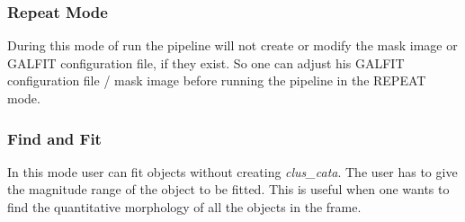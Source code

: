 \documentclass[a4paper,10pt]{article}
\begin{document}
\subsubsection{Repeat Mode}
During this mode of run the pipeline will not create or modify the mask image or GALFIT configuration file, if they exist. So one can adjust his GALFIT configuration file / mask image before running the pipeline in the REPEAT mode.
\subsubsection{Find and Fit}
In this mode user can fit objects without creating \textit{clus\_cata}. The user has to give the magnitude range of the object to be fitted. This is useful when one wants to find the quantitative morphology of all the objects in the frame. 
\end{document}
